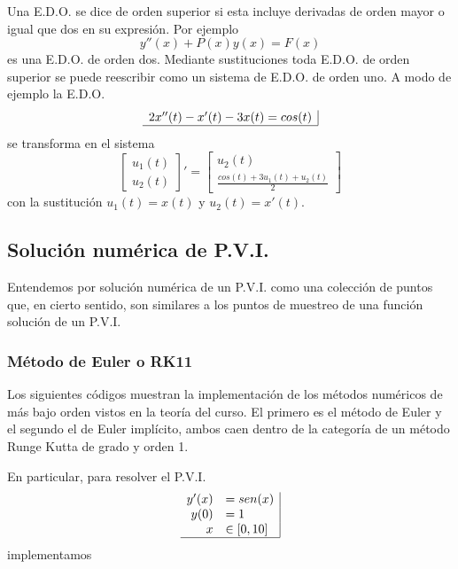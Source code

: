 \documentclass[11pt]{article}
\begin{document}
Una E.D.O. se dice de orden superior si esta incluye derivadas de orden mayor o igual que dos en su expresi\'on. Por ejemplo
$$
y''(x)+P(x)y(x)=F(x)
$$
es una E.D.O. de orden dos. Mediante sustituciones toda E.D.O. de orden superior se puede reescribir como un sistema de E.D.O. de orden uno. A modo de ejemplo la E.D.O.
$$
\begin{array}{c|}
2x''(t)-x'(t)-3x(t)=cos(t) \\
\hline
\end{array}
$$
se transforma en el sistema
$$
\begin{bmatrix}
u_1(t)\\
u_2(t)
\end{bmatrix}'
=
\begin{bmatrix}
u_2(t) \\
\frac{cos(t)+3u_1(t)+u_2(t)}{2}
\end{bmatrix}
$$
con la sustituci\'on
$u_1(t)=x(t)$ y $u_2(t)=x'(t)$.

\subsection{Soluci\'on num\'erica de P.V.I.}
Entendemos por soluci\'on num\'erica de un P.V.I. como una colecci\'on de puntos que, en cierto sentido, son similares a los puntos de muestreo de una funci\'on soluci\'on de un P.V.I.

\subsubsection{M\'etodo de Euler o RK11}
Los siguientes c\'odigos muestran la implementaci\'on de los m\'etodos num\'ericos de m\'as bajo orden vistos en la teor\'ia del curso. El primero es el m\'etodo de Euler y el segundo el de Euler impl\'icito, ambos caen dentro de la categor\'ia de un m\'etodo Runge Kutta de grado y orden 1.

En particular, para resolver el P.V.I.
$$
\begin{array}{rl|}
y'(x)	&=sen(x)\\
y(0)	&=1\\
x		&\in[0,10]\\ \hline
\end{array}
$$
implementamos
\end{document}
